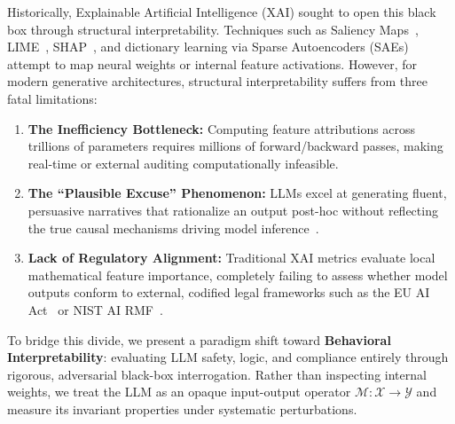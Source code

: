 \documentclass{article}
\begin{document}
Historically, Explainable Artificial Intelligence (XAI) sought to open this black box through structural interpretability. Techniques such as Saliency Maps~\citep{sundararajan2017axiomatic}, LIME~\citep{ribeiro2016why}, SHAP~\citep{lundberg2017unified, shapley1953value}, and dictionary learning via Sparse Autoencoders (SAEs)~\citep{bricken2023monosemanticity, templeton2024scaling} attempt to map neural weights or internal feature activations. However, for modern generative architectures, structural interpretability suffers from three fatal limitations:
\begin{enumerate}
    \item \textbf{The Inefficiency Bottleneck:} Computing feature attributions across trillions of parameters requires millions of forward/backward passes, making real-time or external auditing computationally infeasible.
    \item \textbf{The ``Plausible Excuse'' Phenomenon:} LLMs excel at generating fluent, persuasive narratives that rationalize an output post-hoc without reflecting the true causal mechanisms driving model inference~\citep{turpin2024language}.
    \item \textbf{Lack of Regulatory Alignment:} Traditional XAI metrics evaluate local mathematical feature importance, completely failing to assess whether model outputs conform to external, codified legal frameworks such as the EU AI Act~\citep{eu2024ai-act} or NIST AI RMF~\citep{nist2023airmf}.
\end{enumerate}

To bridge this divide, we present a paradigm shift toward \textbf{Behavioral Interpretability}: evaluating LLM safety, logic, and compliance entirely through rigorous, adversarial black-box interrogation. Rather than inspecting internal weights, we treat the LLM as an opaque input-output operator $\mathcal{M}: \mathcal{X} \to \mathcal{Y}$ and measure its invariant properties under systematic perturbations.
\end{document}
